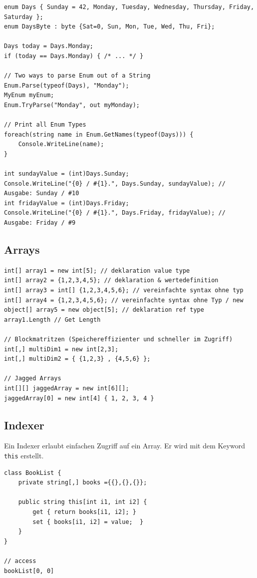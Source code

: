 \documentclass[
a4paper,
oneside,
10pt,
fleqn,
headsepline,
toc=listofnumbered, 
bibliography=totocnumbered]{scrartcl}
\begin{document}
\begin{lstlisting}
enum Days { Sunday = 42, Monday, Tuesday, Wednesday, Thursday, Friday, Saturday };
enum DaysByte : byte {Sat=0, Sun, Mon, Tue, Wed, Thu, Fri};  

Days today = Days.Monday;
if (today == Days.Monday) { /* ... */ }

// Two ways to parse Enum out of a String
Enum.Parse(typeof(Days), "Monday");
MyEnum myEnum;
Enum.TryParse("Monday", out myMonday);

// Print all Enum Types
foreach(string name in Enum.GetNames(typeof(Days))) {
	Console.WriteLine(name);
}

int sundayValue = (int)Days.Sunday;
Console.WriteLine("{0} / #{1}.", Days.Sunday, sundayValue); // Ausgabe: Sunday / #10
int fridayValue = (int)Days.Friday;
Console.WriteLine("{0} / #{1}.", Days.Friday, fridayValue); // Ausgabe: Friday / #9
\end{lstlisting}

\subsection{Arrays}
\begin{lstlisting}
int[] array1 = new int[5]; // deklaration value type
int[] array2 = {1,2,3,4,5}; // deklaration & wertedefinition
int[] array3 = int[] {1,2,3,4,5,6}; // vereinfachte syntax ohne typ
int[] array4 = {1,2,3,4,5,6}; // vereinfachte syntax ohne Typ / new
object[] array5 = new object[5]; // deklaration ref type
array1.Length // Get Length

// Blockmatritzen (Speichereffizienter und schneller im Zugriff)
int[,] multiDim1 = new int[2,3];
int[,] multiDim2 = { {1,2,3} , {4,5,6} };

// Jagged Arrays
int[][] jaggedArray = new int[6][];
jaggedArray[0] = new int[4] { 1, 2, 3, 4 }
\end{lstlisting}

\subsection{Indexer}
Ein Indexer erlaubt einfachen Zugriff auf ein Array. Er wird mit dem Keyword \lstinline|this| erstellt.
\begin{lstlisting}
class BookList {
	private string[,] books ={{},{},{}};

	public string this[int i1, int i2] {
		get { return books[i1, i2]; }
		set { books[i1, i2] = value;  } 
	}
}

// access
bookList[0, 0]
\end{lstlisting}
\end{document}
